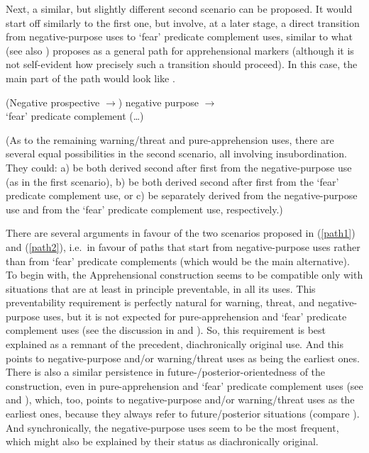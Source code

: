 \documentclass[output=paper,colorlinks,citecolor=brown
]{langscibook}
\begin{document}
 Next, a similar, but slightly different second scenario can be proposed. It would start off similarly to the first one, but involve, at a later stage, a direct transition from negative-purpose uses to `fear' predicate complement uses, similar to what \citet[319]{lichtenberk1995} (see also \cite[186--187]{Schmidtke-Bode2009}) proposes as a general path for apprehensional markers (although it is not self-evident how precisely such a transition should proceed). In this case, the main part of the path would look like .

\ea\label{path2} \textnormal{(Negative prospective $\rightarrow$) negative purpose $\rightarrow$ \\
`fear' predicate complement (\dots)}
\z

 (As to the remaining warning\slash threat and pure-apprehension uses, there are several equal possibilities in the second scenario, all involving insubordination. They could: a) be both derived second after first from the negative-purpose use (as in the first scenario), b) be both derived second after first from the `fear' predicate complement use, or c) be separately derived from the negative-purpose use and from the `fear' predicate complement use, respectively.)

There are several arguments in favour of the two scenarios proposed in (\ref{path1}) and (\ref{path2}), i.e.\ in favour of paths that start from negative-purpose uses rather than from `fear' predicate complements (which would be the main alternative). To begin with, the Apprehensional construction seems to be compatible only with situations that are at least in principle preventable, in all its uses. This preventability requirement is perfectly natural for warning, threat, and negative-purpose uses, but it is not expected for pure-apprehension and `fear' predicate complement uses (see the discussion in  and ). So, this requirement is best explained as a remnant of the precedent, diachronically original use. And this points to negative-purpose and\slash or warning\slash threat uses as being the earliest ones. There is also a similar persistence in \mbox{future-}\slash posterior-orientedness of the construction, even in pure-apprehension and `fear' predicate complement uses (see  and ), which, too, points to negative-purpose and/or warning\slash threat uses as the earliest ones, because they always refer to future\slash posterior situations (compare \cite[320]{lichtenberk1995}). And synchronically, the negative-purpose uses seem to be the most frequent, which might also be explained by their status as diachronically original.
\end{document}
